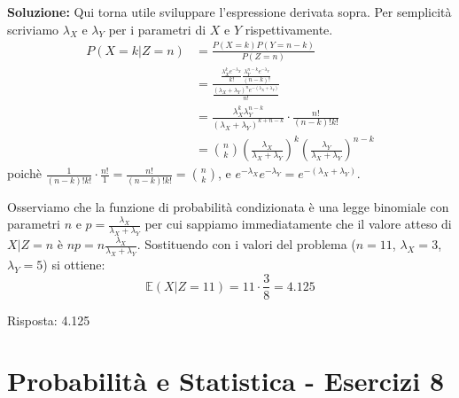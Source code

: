 \documentclass[12pt, a4paper]{article}
\begin{document}
\textbf{Soluzione:}
Qui torna utile sviluppare l’espressione derivata sopra. Per semplicità scriviamo $\lambda_X$ e $\lambda_Y$ per i parametri di $X$ e $Y$ rispettivamente.
$$ \begin{aligned} P(X=k|Z=n) &= \frac{P(X=k)P(Y=n-k)}{P(Z=n)} \\ &= \frac{ \frac{\lambda_X^k e^{-\lambda_X}}{k!} \frac{\lambda_Y^{n-k} e^{-\lambda_Y}}{(n-k)!} }{ \frac{(\lambda_X+\lambda_Y)^n e^{-(\lambda_X+\lambda_Y)}}{n!} } \\ &= \frac{\lambda_X^k \lambda_Y^{n-k}}{(\lambda_X+\lambda_Y)^{k+n-k}} \cdot \frac{n!}{(n-k)!k!} \\ &= \binom{n}{k} \left(\frac{\lambda_X}{\lambda_X+\lambda_Y}\right)^k \left(\frac{\lambda_Y}{\lambda_X+\lambda_Y}\right)^{n-k} \end{aligned} $$
poichè $\frac{1}{(n-k)!k!} \cdot \frac{n!}{1} = \frac{n!}{(n-k)!k!} = \binom{n}{k}$, e $e^{-\lambda_X} e^{-\lambda_Y} = e^{-(\lambda_X+\lambda_Y)}$.

Osserviamo che la funzione di probabilità condizionata è una legge binomiale con parametri $n$ e $p = \frac{\lambda_X}{\lambda_X+\lambda_Y}$ per cui sappiamo immediatamente che il valore atteso di $X|Z=n$ è $np = n\frac{\lambda_X}{\lambda_X+\lambda_Y}$.
Sostituendo con i valori del problema ($n=11$, $\lambda_X=3$, $\lambda_Y=5$) si ottiene:
$$ \mathbb{E}(X|Z=11) = 11 \cdot \frac{3}{8} = 4.125 $$

Risposta: 4.125

\section*{Probabilità e Statistica - Esercizi 8}
\end{document}
